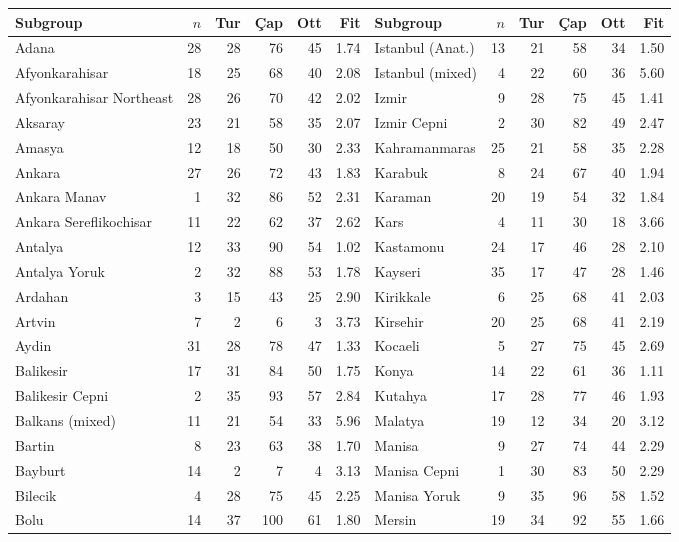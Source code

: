 \begin{tabular}{@{}lrrrrr@{\hspace{14pt}}lrrrrr@{}}
\toprule
Subgroup & $n$ & Tur & Çap & Ott & Fit & Subgroup & $n$ & Tur & Çap & Ott & Fit \\
\midrule
Adana & 28 & 28 & 76 & 45 & 1.74 & Istanbul (Anat.) & 13 & 21 & 58 & 34 & 1.50 \\
Afyonkarahisar & 18 & 25 & 68 & 40 & 2.08 & Istanbul (mixed) & 4 & 22 & 60 & 36 & 5.60 \\
Afyonkarahisar Northeast & 28 & 26 & 70 & 42 & 2.02 & Izmir & 9 & 28 & 75 & 45 & 1.41 \\
Aksaray & 23 & 21 & 58 & 35 & 2.07 & Izmir Cepni & 2 & 30 & 82 & 49 & 2.47 \\
Amasya & 12 & 18 & 50 & 30 & 2.33 & Kahramanmaras & 25 & 21 & 58 & 35 & 2.28 \\
Ankara & 27 & 26 & 72 & 43 & 1.83 & Karabuk & 8 & 24 & 67 & 40 & 1.94 \\
Ankara Manav & 1 & 32 & 86 & 52 & 2.31 & Karaman & 20 & 19 & 54 & 32 & 1.84 \\
Ankara Sereflikochisar & 11 & 22 & 62 & 37 & 2.62 & Kars & 4 & 11 & 30 & 18 & 3.66 \\
Antalya & 12 & 33 & 90 & 54 & 1.02 & Kastamonu & 24 & 17 & 46 & 28 & 2.10 \\
Antalya Yoruk & 2 & 32 & 88 & 53 & 1.78 & Kayseri & 35 & 17 & 47 & 28 & 1.46 \\
Ardahan & 3 & 15 & 43 & 25 & 2.90 & Kirikkale & 6 & 25 & 68 & 41 & 2.03 \\
Artvin & 7 & 2 & 6 & 3 & 3.73 & Kirsehir & 20 & 25 & 68 & 41 & 2.19 \\
Aydin & 31 & 28 & 78 & 47 & 1.33 & Kocaeli & 5 & 27 & 75 & 45 & 2.69 \\
Balikesir & 17 & 31 & 84 & 50 & 1.75 & Konya & 14 & 22 & 61 & 36 & 1.11 \\
Balikesir Cepni & 2 & 35 & 93 & 57 & 2.84 & Kutahya & 17 & 28 & 77 & 46 & 1.93 \\
Balkans (mixed) & 11 & 21 & 54 & 33 & 5.96 & Malatya & 19 & 12 & 34 & 20 & 3.12 \\
Bartin & 8 & 23 & 63 & 38 & 1.70 & Manisa & 9 & 27 & 74 & 44 & 2.29 \\
Bayburt & 14 & 2 & 7 & 4 & 3.13 & Manisa Cepni & 1 & 30 & 83 & 50 & 2.29 \\
Bilecik & 4 & 28 & 75 & 45 & 2.25 & Manisa Yoruk & 9 & 35 & 96 & 58 & 1.52 \\
Bolu & 14 & 37 & 100 & 61 & 1.80 & Mersin & 19 & 34 & 92 & 55 & 1.66 \\

\end{tabular}
